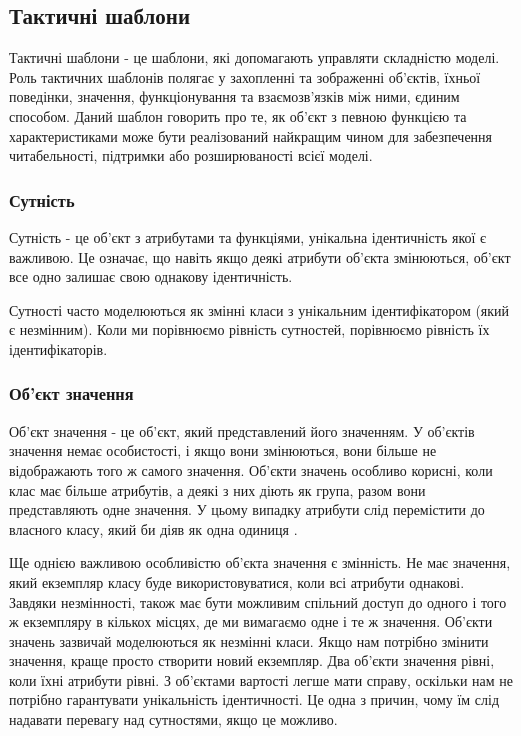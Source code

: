 \subsection{Тактичні шаблони}
Тактичні шаблони - це шаблони, які допомагають управляти складністю моделі.
Роль тактичних шаблонів полягає у захопленні та зображенні об'єктів, їхньої поведінки,
значення, функціонування та взаємозв'язків між ними, єдиним способом.
Даний шаблон говорить про те, як об'єкт з певною функцією та характеристиками
може бути реалізований найкращим чином для забезпечення читабельності,
підтримки або розширюваності всієї моделі.

\subsubsection{Сутність}

Сутність - це об'єкт з атрибутами та функціями, унікальна ідентичність якої є важливою.
Це означає, що навіть якщо деякі атрибути об'єкта змінюються,
об'єкт все одно залишає свою однакову ідентичність.

Сутності часто моделюються як змінні класи з унікальним ідентифікатором (який є незмінним).
Коли ми порівнюємо рівність сутностей, порівнюємо рівність їх ідентифікаторів.

\subsubsection{Об'єкт значення}
Об'єкт значення - це об'єкт, який представлений його значенням.
У об'єктів значення немає особистості, і якщо вони змінюються,
вони більше не відображають того ж самого значення. Об'єкти значень особливо корисні,
коли клас має більше атрибутів, а деякі з них діють як група,
разом вони представляють одне значення.
У цьому випадку атрибути слід перемістити до власного класу, який би діяв як одна одиниця \cite{ddd-vernon}.

Ще однією важливою особливістю об'єкта значення є змінність.
Не має значення, який екземпляр класу буде використовуватися,
коли всі атрибути однакові. Завдяки незмінності, також має бути
можливим спільний доступ до одного і того ж екземпляру в кількох місцях,
де ми вимагаємо одне і те ж значення. Об'єкти значень зазвичай
моделюються як незмінні класи. Якщо нам потрібно змінити значення,
краще просто створити новий екземпляр. Два об'єкти значення рівні,
коли їхні атрибути рівні. З об'єктами вартості легше мати справу,
оскільки нам не потрібно гарантувати унікальність ідентичності.
Це одна з причин, чому їм слід надавати перевагу над сутностями, якщо це можливо.

